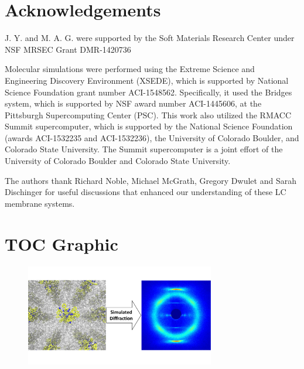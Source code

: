\documentclass[journal=jpcbfk,manuscript=article]{achemso}
\begin{document}
  \section*{Acknowledgements}

  J. Y. and M. A. G. were supported by the Soft Materials Research Center under NSF 
  MRSEC Grant DMR-1420736

  Molecular simulations were performed using the Extreme Science and
  Engineering Discovery Environment (XSEDE), which is supported by National
  Science Foundation grant number ACI-1548562. Specifically, it used the Bridges
  system, which is supported by NSF award number ACI-1445606, at the Pittsburgh
  Supercomputing Center (PSC). This work also utilized the RMACC Summit supercomputer,
  which is supported by the National Science Foundation (awards ACI-1532235 and
  ACI-1532236), the University of Colorado Boulder, and Colorado State
  University. The Summit supercomputer is a joint effort of the University of
  Colorado Boulder and Colorado State University.

  The authors thank Richard Noble, Michael McGrath, Gregory Dwulet and Sarah Dischinger
  for useful discussions that enhanced our understanding of these LC membrane systems. 

  \clearpage
  
  
  \newpage
  
  \section*{TOC Graphic}
  \begin{figure}
  \includegraphics[width=3.25in]{new_toc_graphic.pdf}
 \end{figure}
\end{document}
